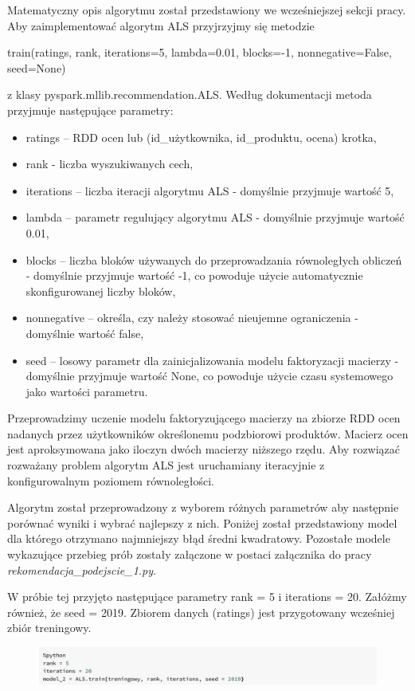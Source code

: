 \documentclass[12pt,a4paper]{report}
\begin{document}
Matematyczny opis algorytmu został przedstawiony we wcześniejszej sekcji pracy.
Aby zaimplementować algorytm ALS przyjrzyjmy się metodzie 
\begin{center}
train(ratings, rank, iterations=5, lambda=0.01, blocks=-1, nonnegative=False, seed=None)
\end{center}
z klasy pyspark.mllib.recommendation.ALS. Według dokumentacji metoda przyjmuje następujące parametry:
\begin{itemize}
\item ratings – RDD ocen lub (id\_użytkownika, id\_produktu, ocena) krotka,
\item rank - liczba wyszukiwanych cech,
\item iterations – liczba iteracji algorytmu ALS - domyślnie przyjmuje wartość 5,
\item lambda – parametr regulujący algorytmu ALS - domyślnie przyjmuje wartość 0.01,
\item blocks – liczba bloków używanych do przeprowadzania równoległych obliczeń - domyślnie przyjmuje wartość -1, co powoduje użycie automatycznie skonfigurowanej liczby bloków,
\item nonnegative – określa, czy należy stosować nieujemne ograniczenia - domyślnie wartość false,
\item seed – losowy parametr dla zainicjalizowania modelu faktoryzacji macierzy - domyślnie przyjmuje wartość None, co powoduje użycie czasu systemowego jako wartości parametru.
\end{itemize}

Przeprowadzimy uczenie modelu faktoryzującego macierzy na zbiorze RDD ocen nadanych przez użytkowników określonemu podzbiorowi produktów. Macierz ocen jest aproksymowana jako iloczyn dwóch macierzy niższego rzędu. Aby rozwiązać rozważany problem algorytm ALS jest uruchamiany iteracyjnie z konfigurowalnym poziomem równoległości.

Algorytm został przeprowadzony z wyborem różnych parametrów aby następnie porównać wyniki i wybrać najlepszy z nich.
Poniżej został przedstawiony model dla którego otrzymano najmniejszy błąd średni kwadratowy.
Pozostałe modele wykazujące przebieg prób zostały załączone w postaci załącznika do pracy \textit{rekomendacja\_podejscie\_1.py}. 

W próbie tej przyjęto następujące parametry rank = 5 i iterations = 20. Załóżmy również, że seed = 2019. Zbiorem danych (ratings) jest przygotowany wcześniej zbiór treningowy.

\begin{figure}[H]
\includegraphics[scale=0.5]{obrazy/ALS8.PNG} 
\end{figure}
\end{document}
